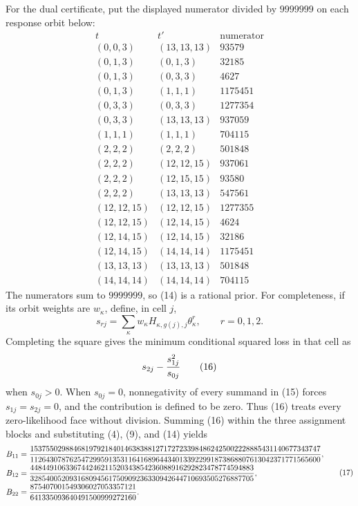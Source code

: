 For the dual certificate, put the displayed numerator divided by \(9999999\) on each response orbit below:
\[
\begin{array}{c|c|r}
t&t'&\text{numerator}\\ \hline
(0,0,3)&(13,13,13)&93579\\
(0,1,3)&(0,1,3)&32185\\
(0,1,3)&(0,3,3)&4627\\
(0,1,3)&(1,1,1)&1175451\\
(0,3,3)&(0,3,3)&1277354\\
(0,3,3)&(13,13,13)&937059\\
(1,1,1)&(1,1,1)&704115\\
(2,2,2)&(2,2,2)&501848\\
(2,2,2)&(12,12,15)&937061\\
(2,2,2)&(12,15,15)&93580\\
(2,2,2)&(13,13,13)&547561\\
(12,12,15)&(12,12,15)&1277355\\
(12,12,15)&(12,14,15)&4624\\
(12,14,15)&(12,14,15)&32186\\
(12,14,15)&(14,14,14)&1175451\\
(13,13,13)&(13,13,13)&501848\\
(14,14,14)&(14,14,14)&704115
\end{array}                                                                 \tag{14}
\]
The numerators sum to \(9999999\), so (14) is a rational prior.  For completeness, if its orbit weights are \(w_\kappa\), define, in cell \(j\),
\[
s_{rj}=\sum_\kappa w_\kappa H_{\kappa,g(j),j}\theta_\kappa^r,
\qquad r=0,1,2.                                                            \tag{15}
\]
Completing the square gives the minimum conditional squared loss in that cell as
\[
s_{2j}-{s_{1j}^2\over s_{0j}}                                               \tag{16}
\]
when \(s_{0j}>0\).  When \(s_{0j}=0\), nonnegativity of every summand in (15) forces \(s_{1j}=s_{2j}=0\), and the contribution is defined to be zero.  Thus (16) treats every zero-likelihood face without division.  Summing (16) within the three assignment blocks and substituting (4), (9), and (14) yields
\[
\begin{split}
B_{11}&={15375502988468197921840146383881271727233984862425002228885431140677343747
\over11264307876254729959135311641689644340133922991873868807613042371771565600},\\
B_{12}&={448449106336744246211520343854236088916292823478774594883
\over328540052093168094561750909236330942644710693505276887705},\\
B_{22}&={875407001549306027053357121
\over641335093640491500999272160}.
\end{split}                                                                 \tag{17}
\]
